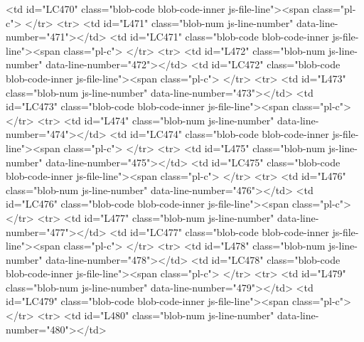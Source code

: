         <td id="LC470" class="blob-code blob-code-inner js-file-line"><span class="pl-c">%
      </tr>
      <tr>
        <td id="L471" class="blob-num js-line-number" data-line-number="471"></td>
        <td id="LC471" class="blob-code blob-code-inner js-file-line"><span class="pl-c">%
      </tr>
      <tr>
        <td id="L472" class="blob-num js-line-number" data-line-number="472"></td>
        <td id="LC472" class="blob-code blob-code-inner js-file-line"><span class="pl-c">%
      </tr>
      <tr>
        <td id="L473" class="blob-num js-line-number" data-line-number="473"></td>
        <td id="LC473" class="blob-code blob-code-inner js-file-line"><span class="pl-c">%
      </tr>
      <tr>
        <td id="L474" class="blob-num js-line-number" data-line-number="474"></td>
        <td id="LC474" class="blob-code blob-code-inner js-file-line"><span class="pl-c">%
      </tr>
      <tr>
        <td id="L475" class="blob-num js-line-number" data-line-number="475"></td>
        <td id="LC475" class="blob-code blob-code-inner js-file-line"><span class="pl-c">%
      </tr>
      <tr>
        <td id="L476" class="blob-num js-line-number" data-line-number="476"></td>
        <td id="LC476" class="blob-code blob-code-inner js-file-line"><span class="pl-c">%
      </tr>
      <tr>
        <td id="L477" class="blob-num js-line-number" data-line-number="477"></td>
        <td id="LC477" class="blob-code blob-code-inner js-file-line"><span class="pl-c">%
      </tr>
      <tr>
        <td id="L478" class="blob-num js-line-number" data-line-number="478"></td>
        <td id="LC478" class="blob-code blob-code-inner js-file-line"><span class="pl-c">%
      </tr>
      <tr>
        <td id="L479" class="blob-num js-line-number" data-line-number="479"></td>
        <td id="LC479" class="blob-code blob-code-inner js-file-line"><span class="pl-c">%
      </tr>
      <tr>
        <td id="L480" class="blob-num js-line-number" data-line-number="480"></td>

